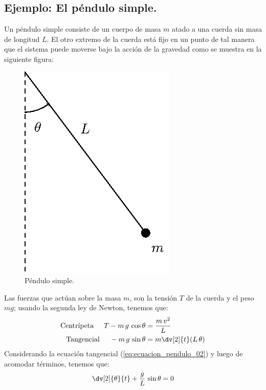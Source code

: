 \subsection{Ejemplo: El péndulo simple.}
Un péndulo simple consiste de un cuerpo de masa $m$ atado a una cuerda sin masa de longitud $L$. El otro extremo de la cuerda está fijo en un punto de tal manera que el sistema puede moverse bajo la acción de la gravedad como se muestra en la siguiente figura:
\begin{figure}[H]
    \centering
    \includegraphics[scale=1.3]{Imagenes/pendulo_01.eps}
    \caption{Péndulo simple.}
\end{figure}
Las fuerzas que actúan sobre la masa $m$, son la tensión $T$ de la cuerda y el peso $mg$; usando la segunda ley de Newton, tenemos que:
\begin{align}
\text{Centrípeta} \hspace{0.5cm} T - m \, g \, \cos \theta &= \dfrac{m \, v^{2}}{L}  \label{eq:ecuacion_pendulo_01} \\
\text{Tangencial} \hspace{0.5cm} -m \, g \, \sin \theta &= m \dv[2]{t} (L \, \theta) \label{eq:ecuacion_pendulo_02}
\end{align}
Considerando la ecuación tangencial (\ref{eq:ecuacion_pendulo_02}) y luego de acomodar términos, tenemos que:
\begin{equation} \dv[2]{\theta}{t} + \dfrac{g}{L} \, \sin \theta = 0
\label{eq:ecuacion_pendulo_03}
\end{equation}
